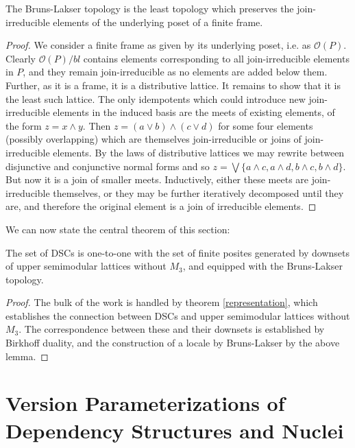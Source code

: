 \documentclass[a4paper,USenglish,cleveref, autoref, thm-restate,authorcolumns]{lipics-v2019}
\newcommand{\Oc}{\mathcal{O}}
\begin{document}
\begin{lemma}
The Bruns-Lakser topology is the least topology which preserves the join-irreducible elements of the underlying poset of a finite frame.
\end{lemma}
\begin{proof}
We consider a finite frame as given by its underlying poset, i.e. as \(\Oc(P)\). Clearly \(\Oc(P)/bl\) contains elements corresponding to all join-irreducible elements in \(P\), and they remain join-irreducible as no elements are added below them. Further, as it is a frame, it is a distributive lattice. It remains to show that it is the least such lattice. The only idempotents which could introduce new join-irreducible elements in the induced basis are the meets of existing elements, of the form  \(z = x \wedge y\). Then \(z = (a \vee b) \wedge (c \vee d)\) for some four elements (possibly overlapping) which are themselves join-irreducible or joins of join-irreducible elements.  By the laws of distributive lattices we may rewrite between disjunctive and conjunctive normal forms and so \(z = \bigvee \{a \wedge c, a \wedge d, b \wedge c, b \wedge d\}\).  But now it is a join of smaller meets. Inductively, either these meets are join-irreducible themselves, or they may be further iteratively decomposed until they are, and therefore the original element is a join of irreducible elements.
\end{proof}

We can now state the central theorem of this section:

\begin{theorem}
The set of DSCs is one-to-one with the set of finite posites generated by downsets of upper semimodular lattices without \(M_3\), and equipped with the Bruns-Lakser topology.
\end{theorem}
\begin{proof}
The bulk of the work is handled by theorem \ref{representation}, which establishes the connection between DSCs and upper semimodular lattices without \(M_3\). The correspondence between these and their downsets is established by Birkhoff duality, and the construction of a locale by Bruns-Lakser by the above lemma.
\end{proof}

\section{Version Parameterizations of Dependency Structures and Nuclei}
\end{document}
